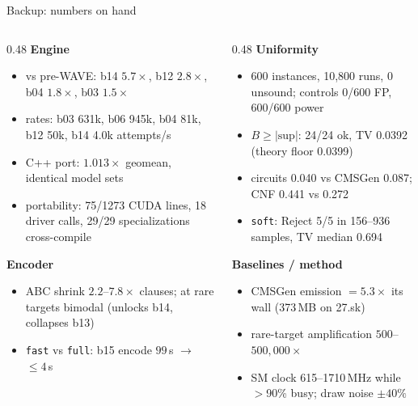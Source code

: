 \begin{frame}{Backup: numbers on hand}
  \footnotesize
  \begin{columns}[T]
    \begin{column}{0.48\textwidth}
      \textbf{Engine}
      \begin{itemize}
        \item vs pre-WAVE: b14 $5.7\times$, b12 $2.8\times$, b04 $1.8\times$, b03 $1.5\times$
        \item rates: b03 631k, b06 945k, b04 81k, b12 50k, b14 4.0k attempts/s
        \item C++ port: $1.013\times$ geomean, identical model sets
        \item portability: 75/1273 CUDA lines, 18 driver calls, 29/29 specializations cross-compile
      \end{itemize}
      \textbf{Encoder}
      \begin{itemize}
        \item ABC shrink $2.2$--$7.8\times$ clauses; at rare targets bimodal (unlocks b14, collapses b13)
        \item \texttt{fast} vs \texttt{full}: b15 encode $99$\,s $\rightarrow$ ${\le}4$\,s
      \end{itemize}
    \end{column}
    \begin{column}{0.48\textwidth}
      \textbf{Uniformity}
      \begin{itemize}
        \item 600 instances, 10{,}800 runs, 0 unsound; controls 0/600 FP, 600/600 power
        \item $B\ge|\text{sup}|$: 24/24 ok, TV 0.0392 (theory floor 0.0399)
        \item circuits 0.040 vs CMSGen 0.087; CNF 0.441 vs 0.272
        \item \texttt{soft}: Reject 5/5 in 156--936 samples, TV median 0.694
      \end{itemize}
      \textbf{Baselines / method}
      \begin{itemize}
        \item CMSGen emission $= 5.3\times$ its wall (373\,MB on 27.sk)
        \item rare-target amplification $500$--$500{,}000\times$
        \item SM clock 615--1710\,MHz while $>$90\% busy; draw noise $\pm40\%$
      \end{itemize}
    \end{column}
  \end{columns}
\end{frame}


